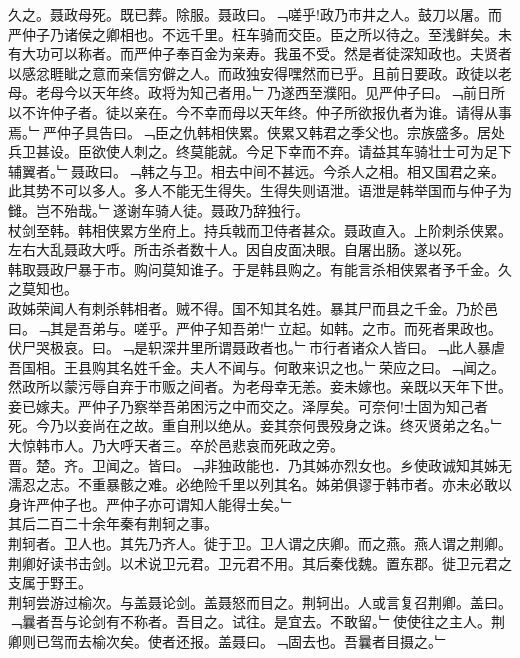 \documentclass{zhvt-classic}
\begin{document}
\hspace*{2em}久之。聂政母死。既已葬。除服。聂政曰。﹁嗟乎!政乃市井之人。鼓刀以屠。而严仲子乃诸侯之卿相也。不远千里。枉车骑而交臣。臣之所以待之。至浅鲜矣。未有大功可以称者。而严仲子奉百金为亲寿。我虽不受。然是者徒深知政也。夫贤者以感忿睚眦之意而亲信穷僻之人。而政独安得嘿然而已乎。且前日要政。政徒以老母。老母今以天年终。政将为知己者用。﹂乃遂西至濮阳。见严仲子曰。﹁前日所以不许仲子者。徒以亲在。今不幸而母以天年终。仲子所欲报仇者为谁。请得从事焉。﹂严仲子具告曰。﹁臣之仇韩相侠累。侠累又韩君之季父也。宗族盛多。居处兵卫甚设。臣欲使人刺之。终莫能就。今足下幸而不弃。请益其车骑壮士可为足下辅翼者。﹂聂政曰。﹁韩之与卫。相去中间不甚远。今杀人之相。相又国君之亲。此其势不可以多人。多人不能无生得失。生得失则语泄。语泄是韩举国而与仲子为雠。岂不殆哉。﹂遂谢车骑人徒。聂政乃辞独行。\\
\hspace*{2em}杖剑至韩。韩相侠累方坐府上。持兵戟而卫侍者甚众。聂政直入。上阶刺杀侠累。左右大乱聂政大呼。所击杀者数十人。因自皮面决眼。自屠出肠。遂以死。\\
\hspace*{2em}韩取聂政尸暴于市。购问莫知谁子。于是韩县购之。有能言杀相侠累者予千金。久之莫知也。\\
\hspace*{2em}政姊荣闻人有刺杀韩相者。贼不得。国不知其名姓。暴其尸而县之千金。乃於邑曰。﹁其是吾弟与。嗟乎。严仲子知吾弟!﹂立起。如韩。之市。而死者果政也。伏尸哭极哀。曰。﹁是轵深井里所谓聂政者也。﹂市行者诸众人皆曰。﹁此人暴虐吾国相。王县购其名姓千金。夫人不闻与。何敢来识之也。﹂荣应之曰。﹁闻之。然政所以蒙污辱自弃于市贩之间者。为老母幸无恙。妾未嫁也。亲既以天年下世。妾已嫁夫。严仲子乃察举吾弟困污之中而交之。泽厚矣。可奈何!士固为知己者死。今乃以妾尚在之故。重自刑以绝从。妾其奈何畏殁身之诛。终灭贤弟之名。﹂大惊韩市人。乃大呼天者三。卒於邑悲哀而死政之旁。\\
\hspace*{2em}晋。楚。齐。卫闻之。皆曰。﹁非独政能也．乃其姊亦烈女也。乡使政诚知其姊无濡忍之志。不重暴骸之难。必绝险千里以列其名。姊弟俱谬于韩市者。亦未必敢以身许严仲子也。严仲子亦可谓知人能得士矣。﹂\\
\hspace*{2em}其后二百二十余年秦有荆轲之事。\\
\hspace*{2em}荆轲者。卫人也。其先乃齐人。徙于卫。卫人谓之庆卿。而之燕。燕人谓之荆卿。荆卿好读书击剑。以术说卫元君。卫元君不用。其后秦伐魏。置东郡。徙卫元君之支属于野王。\\
\hspace*{2em}荆轲尝游过榆次。与盖聂论剑。盖聂怒而目之。荆轲出。人或言复召荆卿。盖曰。﹁曩者吾与论剑有不称者。吾目之。试往。是宜去。不敢留。﹂使使往之主人。荆卿则已驾而去榆次矣。使者还报。盖聂曰。﹁固去也。吾曩者目摄之。﹂\\
\end{document}
